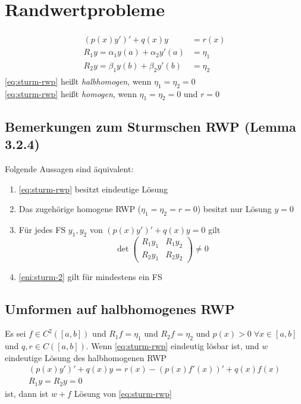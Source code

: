 \section{Randwertprobleme}

\begin{align}
    \tag{Sturmsches RWP}
    \label{eq:sturm-rwp}
    \begin{split}
        \left(p(x)y'\right)' + q(x)y&=r(x)\\
    R_1y =\alpha_1y(a)+\alpha_2y'(a)&=\eta_1\\
    R_2y =\beta_1y(b)+\beta_2y'(b)&=\eta_2
    \end{split}
\end{align}
\eqref{eq:sturm-rwp} heißt \emph{halbhomogen}, wenn $\eta_1 = \eta_2 = 0$\\
\eqref{eq:sturm-rwp} heißt \emph{homogen}, wenn $\eta_1 = \eta_2 = 0$ und $r = 0$

\subsection{Bemerkungen zum Sturmschen RWP (Lemma 3.2.4)}
Folgende Aussagen sind äquivalent:
\begin{enumerate}
    \item \eqref{eq:sturm-rwp} besitzt eindeutige Lösung
    \item Das zugehörige homogene RWP ($\eta_1=\eta_2=r=0$) besitzt nur Lösung $y=0$
    \item Für jedes FS $y_1, y_2$ von $\left(p(x)y'\right)' + q(x)y=0$ gilt \\
    \label{eni:sturm-2}
    \begin{equation*}
        \det \begin{pmatrix}
        R_1y_1 & R_1y_2 \\
        R_2y_1 & R_2y_2
        \end{pmatrix}
        \neq 0
    \end{equation*}
    \item \ref{eni:sturm-2} gilt für mindestens ein FS
\end{enumerate}

\subsection{Umformen auf halbhomogenes RWP}
Es sei $f\in C^2([a,b])$ und $R_1f=\eta_1$ und $R_2f=\eta_2$ und $p(x)>0\; \forall x\in [a,b]$ und $q,r \in C([a,b])$.
Wenn \eqref{eq:sturm-rwp} eindeutig lösbar ist, und $w$ eindeutige Lösung des halbhomogenen RWP
\begin{equation*}
    \begin{gathered}
        \left(p(x)y'\right)' + q(x)y = r(x)-\left( p(x)f'(x) \right)' +q(x)f(x)\\
        R_1y = R_2y=0
    \end{gathered}
\end{equation*}ist, dann ist $w+f$ Lösung von \eqref{eq:sturm-rwp}

